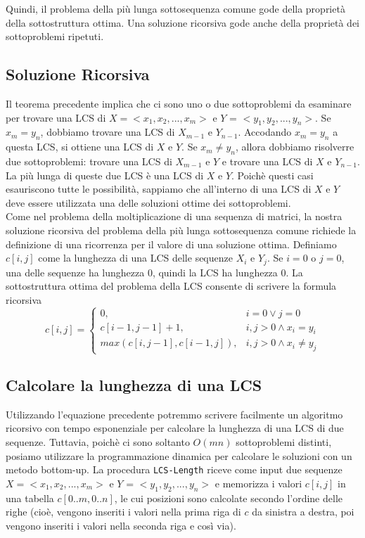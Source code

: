 Quindi, il problema della più lunga sottosequenza comune gode della
proprietà della sottostruttura ottima. Una soluzione ricorsiva gode
anche della proprietà dei sottoproblemi ripetuti.

\subsection{Soluzione Ricorsiva}

Il teorema precedente implica che ci sono uno o due sottoproblemi da
esaminare per trovare una LCS di $X = <x_1, x_2, ..., x_m>$ e $Y$ =
$<y_1, y_2, ..., y_n>$. Se $x_m = y_n$, dobbiamo trovare una LCS di
$X_{m-1}$ e $Y_{n-1}$. Accodando $x_m = y_n$ a questa LCS, si
ottiene una LCS di $X$ e $Y$. Se $x_m \neq y_n$, allora dobbiamo
risolverre due sottoproblemi: trovare una LCS di $X_{m-1}$ e $Y$ e
trovare una LCS di $X$ e $Y_{n-1}$. La più lunga di queste due LCS è
una LCS di $X$ e $Y$. Poichè questi casi esauriscono tutte le
possibilità, sappiamo che all'interno di una LCS di $X$ e $Y$ deve
essere utilizzata una delle soluzioni ottime dei sottoproblemi.\\

Come nel problema della moltiplicazione di una sequenza di matrici, la
nostra soluzione ricorsiva del problema della più lunga sottosequenza
comune richiede la definizione di una ricorrenza per il valore di una
soluzione ottima. Definiamo $c[i,j]$ come la lunghezza di una LCS
delle sequenze $X_i$ e $Y_j$. Se $i = 0$ o $j = 0$, una delle
sequenze ha lunghezza 0, quindi la LCS ha lunghezza 0. La sottostruttura
ottima del problema della LCS consente di scrivere la formula ricorsiva\\

$$
	c[i,j]= \begin{cases}
		0,                         & i = 0 \vee j = 0            \\
		c[i-1, j-1] + 1,           & i, j > 0 \wedge x_i = y_i   \\
		max(c[i, j-1], c[i-1, j]), & i,j > 0 \wedge x_i \neq y_j
	\end{cases}
$$

\subsection{Calcolare la lunghezza di una LCS}

Utilizzando l'equazione precedente potremmo scrivere facilmente un
algoritmo ricorsivo con tempo esponenziale per calcolare la lunghezza di
una LCS di due sequenze. Tuttavia, poichè ci sono soltanto $O(mn)$
sottoproblemi distinti, posiamo utilizzare la programmazione dinamica
per calcolare le soluzioni con un metodo bottom-up. La procedura
\texttt{LCS-Length} riceve come input due sequenze
$X = <x_1, x_2, ..., x_m>$ e $Y$ = $<y_1, y_2, ..., y_n>$ e
memorizza i valori $c[i,j]$ in una tabella $c[0..m, 0..n]$, le cui
posizioni sono calcolate secondo l'ordine delle righe (cioè, vengono
inseriti i valori nella prima riga di $c$ da sinistra a destra, poi
vengono inseriti i valori nella seconda riga e così via).\\

